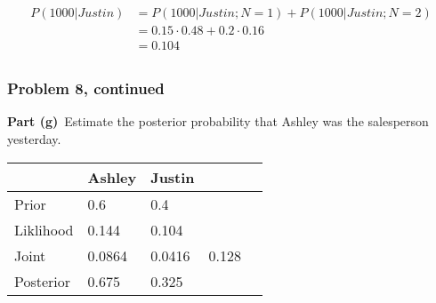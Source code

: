 \documentclass[12pt]{article}
\theoremstyle{definition}
\begin{document}
\begin{align*}
P(1000|Justin) &= P(1000|Justin;N=1) + P(1000|Justin;N=2)\\
&= 0.15 \cdot 0.48 + 0.2 \cdot 0.16\\
&= 0.104\\
\end{align*}

\newpage
\subsubsection*{Problem 8, continued}
\noindent
{\bf Part (g)}\ Estimate the posterior probability that Ashley was the salesperson yesterday.\\

\begin{tabular}{lllll}
&   Ashley   &   Justin   \\
\hline
Prior      &   0.6   &   0.4   &\\
Liklihood  &   0.144   &   0.104   &\\
Joint      &   0.0864   &   0.0416   &   0.128\\
Posterior  &   0.675   &   0.325   &\\
\hline
\end{tabular}
\end{document}
